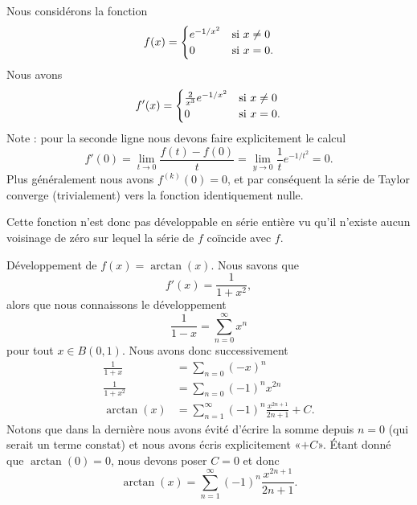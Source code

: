 \begin{example}
    Nous considérons la fonction
    \begin{equation}
        f(x)=\begin{cases}
            e^{-1/x^2}    &   \text{si \( x\neq 0\)}\\
            0    &    \text{si \( x=0\).}
        \end{cases}
    \end{equation}
    Nous avons
    \begin{equation}
        f'(x)=\begin{cases}
            \frac{ 2 }{ x^3 } e^{-1/x^2}    &   \text{si \( x\neq 0\)}\\
            0    &    \text{si \( x=0\)}.
        \end{cases}
    \end{equation}
    Note : pour la seconde ligne nous devons faire explicitement le calcul
    \begin{equation}
        f'(0)=\lim_{t\to 0} \frac{ f(t)-f(0) }{ t }=\lim_{y\to 0} \frac{1}{ t } e^{-1/t^2}=0.
    \end{equation}
    Plus généralement nous avons \( f^{(k)}(0)=0\), et par conséquent la série de Taylor converge (trivialement) vers la fonction identiquement nulle.

    Cette fonction n'est donc pas développable en série entière vu qu'il n'existe aucun voisinage de zéro sur lequel la série de \( f\) coïncide avec \( f\).
\end{example}

\begin{example}     \label{ExwobBAW}
    Développement de \( f(x)=\arctan(x)\). Nous savons que
    \begin{equation}
        f'(x)=\frac{1}{ 1+x^2 },
    \end{equation}
    alors que nous connaissons le développement
    \begin{equation}    \label{EqVmuaqT}
        \frac{1}{ 1-x }=\sum_{n=0}^{\infty}x^n
    \end{equation}
    pour tout \( x\in B(0,1)\). Nous avons donc successivement
    \begin{subequations}
        \begin{align}
            \frac{1}{ 1+x }&=\sum_{n=0}(-x)^n\\
            \frac{ 1 }{ 1+x^2 }&=\sum_{n=0}(-1)^nx^{2n}\\
            \arctan(x)&=\sum_{n=1}^{\infty}(-1)^n\frac{ x^{2n+1} }{ 2n+1 }+C.
        \end{align}
    \end{subequations}
    Notons que dans la dernière nous avons évité d'écrire la somme depuis \( n=0\) (qui serait un terme constat) et nous avons écris explicitement «\( +C\)». Étant donné que \( \arctan(0)=0\), nous devons poser \( C=0\) et donc
    \begin{equation}
        \arctan(x)=\sum_{n=1}^{\infty}(-1)^n\frac{ x^{2n+1} }{ 2n+1 }.
    \end{equation}
\end{example}

